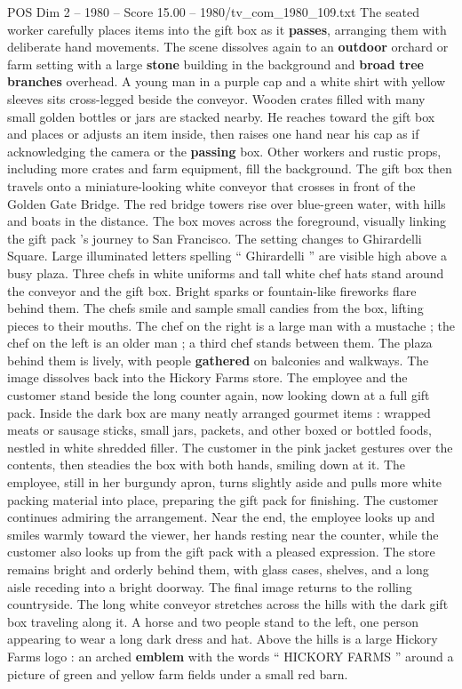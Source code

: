 \begin{textsample}{POS Dim 2 – 1980 – Score 15.00 – 1980/tv\_com\_1980\_109.txt}
The seated worker carefully places items into the gift box as it \textbf{passes}, arranging them with deliberate hand movements.
The scene dissolves again to an \textbf{outdoor} orchard or farm setting with a large \textbf{stone} building in the background and \textbf{broad} \textbf{tree} \textbf{branches} overhead.
A young man in a purple cap and a white shirt with yellow sleeves sits cross-legged beside the conveyor.
Wooden crates filled with many small golden bottles or jars are stacked nearby.
He reaches toward the gift box and places or adjusts an item inside, then raises one hand near his cap as if acknowledging the camera or the \textbf{passing} box.
Other workers and rustic props, including more crates and farm equipment, fill the background.
The gift box then travels onto a miniature-looking white conveyor that crosses in front of the Golden Gate Bridge.
The red bridge towers rise over blue-green water, with hills and boats in the distance.
The box moves across the foreground, visually linking the gift pack ’s journey to San Francisco.
The setting changes to Ghirardelli Square.
Large illuminated letters spelling “ Ghirardelli ” are visible high above a busy plaza.
Three chefs in white uniforms and tall white chef hats stand around the conveyor and the gift box.
Bright sparks or fountain-like fireworks flare behind them.
The chefs smile and sample small candies from the box, lifting pieces to their mouths.
The chef on the right is a large man with a mustache ; the chef on the left is an older man ; a third chef stands between them.
The plaza behind them is lively, with people \textbf{gathered} on balconies and walkways.
The image dissolves back into the Hickory Farms store.
The employee and the customer stand beside the long counter again, now looking down at a full gift pack.
Inside the dark box are many neatly arranged gourmet items : wrapped meats or sausage sticks, small jars, packets, and other boxed or bottled foods, nestled in white shredded filler.
The customer in the pink jacket gestures over the contents, then steadies the box with both hands, smiling down at it.
The employee, still in her burgundy apron, turns slightly aside and pulls more white packing material into place, preparing the gift pack for finishing.
The customer continues admiring the arrangement.
Near the end, the employee looks up and smiles warmly toward the viewer, her hands resting near the counter, while the customer also looks up from the gift pack with a pleased expression.
The store remains bright and orderly behind them, with glass cases, shelves, and a long aisle receding into a bright doorway.
The final image returns to the rolling countryside.
The long white conveyor stretches across the hills with the dark gift box traveling along it.
A horse and two people stand to the left, one person appearing to wear a long dark dress and hat.
Above the hills is a large Hickory Farms logo : an arched \textbf{emblem} with the words “ HICKORY FARMS ” around a picture of green and yellow farm fields under a small red barn.

\end{textsample}
